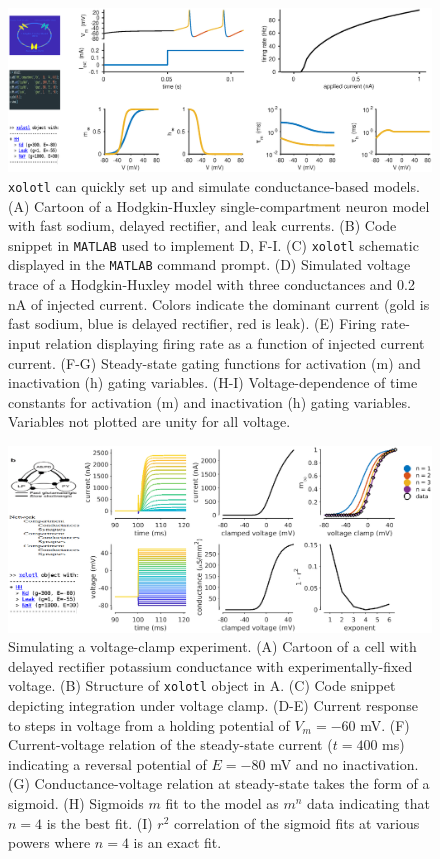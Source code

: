 \documentclass{frontiersSCNS} %
\begin{document}
\begin{figure}
	\centering
	\includegraphics[width=1.0\linewidth]{gfx/figure_HH}
	\caption{\texttt{xolotl} can quickly set up and simulate conductance-based models. (A) Cartoon of a Hodgkin-Huxley single-compartment neuron model with fast sodium, delayed rectifier, and leak currents. (B) Code snippet in \texttt{MATLAB} used to implement D, F-I. (C) \texttt{xolotl} schematic displayed in the \texttt{MATLAB} command prompt. (D) Simulated voltage trace of a Hodgkin-Huxley model with three conductances and 0.2 nA of injected current. Colors indicate the dominant current (gold is fast sodium, blue is delayed rectifier, red is leak). (E) Firing rate-input relation displaying firing rate as a function of injected current current. (F-G) Steady-state gating functions for activation (m) and inactivation (h) gating variables. (H-I) Voltage-dependence of time constants for activation (m) and inactivation (h) gating variables. Variables not plotted are unity for all voltage.}
	\label{fig:figurehh}
\end{figure}

\begin{figure}
	\centering
	\includegraphics[width=1.0\linewidth]{gfx/figure_clamp}
	\caption{Simulating a voltage-clamp experiment. (A) Cartoon of a cell with delayed rectifier potassium conductance \autocite{liuModelNeuronActivitydependent1998} with experimentally-fixed voltage. (B) Structure of \texttt{xolotl} object in A. (C) Code snippet depicting integration under voltage clamp. (D-E) Current response to steps in voltage from a holding potential of $V_m = -60$ mV. (F) Current-voltage relation of the steady-state current ($t = 400$ ms) indicating a reversal potential of $E = -80$ mV and no inactivation. (G) Conductance-voltage relation at steady-state takes the form of a sigmoid. (H) Sigmoids $m$ fit to the model as $m^n$ data indicating that $n=4$ is the best fit. (I) $r^2$ correlation of the sigmoid fits at various powers where $n=4$ is an exact fit.}
	\label{fig:figureclamp}
\end{figure}
\end{document}
